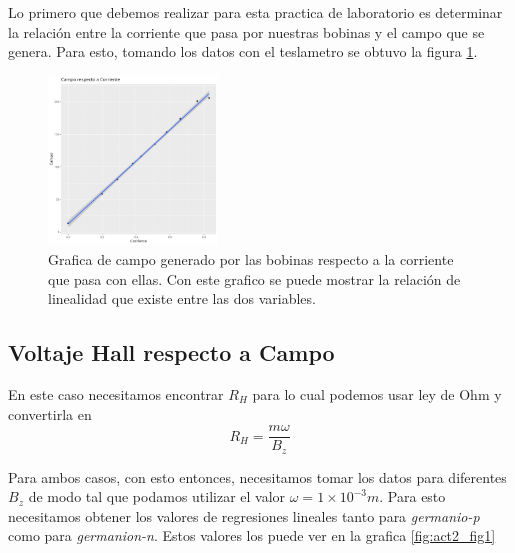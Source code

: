 \documentclass[a4paper, amsfonts, amssymb, amsmath, reprint, showkeys, nofootinbib, twoside]{revtex4-1}
\begin{document}
Lo primero que debemos realizar para esta practica de laboratorio es determinar la relación entre la corriente que pasa por nuestras bobinas y el campo que se genera. Para esto, tomando los datos con el teslametro se obtuvo la figura \ref{fig:act1_fig1}. 

\begin{figure}[h]
  \centering
  \includegraphics[width=0.4\textwidth]{./img/Act1/CampoVsCorriente.png}
  \caption{Grafica de campo generado por las bobinas respecto a la corriente que pasa con ellas. Con este grafico se puede mostrar la relación de linealidad que existe entre las dos variables.}
  \label{fig:act1_fig1}
\end{figure}

\subsection{Voltaje Hall respecto a Campo}

En este caso necesitamos encontrar $R_H$ para lo cual podemos usar ley de Ohm y convertirla en 
\begin{equation}
  R_H = \frac{m \omega}{B_z}
  \label{eq:act2_eq1}
\end{equation}

Para ambos casos, con esto entonces, necesitamos tomar los datos para diferentes $B_z$ de modo tal que podamos utilizar el valor $\omega = 1\times 10^{-3}m$. Para esto necesitamos obtener los valores de regresiones lineales tanto para \textit{germanio-p} como para \textit{germanion-n}. Estos valores los puede ver en la grafica \ref{fig:act2_fig1}
\end{document}
